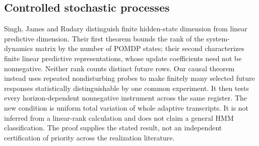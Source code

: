 \subsection{Controlled stochastic processes}
Singh, James and Rudary \cite[Theorems~2 and~6]{SJR2004} distinguish
finite hidden-state dimension from linear predictive dimension. Their
first theorem bounds the rank of the system-dynamics matrix by the
number of POMDP states; their second characterizes finite linear
predictive representations, whose update coefficients need not be
nonnegative. Neither rank counts distinct future rows.
Our causal theorem instead uses repeated nondisturbing probes to make
finitely many selected future responses statistically distinguishable
by one common experiment. It then tests every horizon-dependent
nonnegative instrument across the same register. The new condition is
uniform total variation of whole adaptive transcripts. It is not
inferred from a linear-rank calculation and does not claim a general
HMM classification. The proof supplies the stated result, not an
independent certification of priority across the realization literature.
